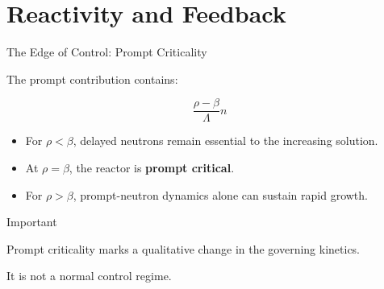\documentclass[aspectratio=169]{beamer}
\begin{document}

\section{Reactivity and Feedback}



\begin{frame}{The Edge of Control: Prompt Criticality}

    The prompt contribution contains:

    \[
        \frac{\rho-\beta}{\Lambda} n
    \]

    \vspace{1em}

    \begin{itemize}

        \item For $\rho < \beta$,
              delayed neutrons remain essential to the increasing solution.

        \item At $\rho = \beta$,
              the reactor is \textbf{prompt critical}.

        \item For $\rho > \beta$,
              prompt-neutron dynamics alone can sustain rapid growth.

    \end{itemize}

    \begin{alertblock}{Important}

        Prompt criticality marks a qualitative change in the governing
        kinetics.

        It is not a normal control regime.

    \end{alertblock}

\end{frame}


\end{document}
